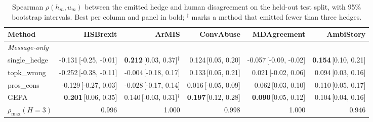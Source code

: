 \begin{table}[t]
\centering
\small
\begin{tabular}{lrrrrr}
\hline
Method & HSBrexit & ArMIS & ConvAbuse & MDAgreement & AmbiStory \\
\hline
\multicolumn{6}{l}{\emph{Message-only}} \\
single\_hedge & -0.131{\scriptsize\,[-0.25, -0.01]} & \textbf{0.212}{\scriptsize\,[0.03, 0.37]}$^\dagger$ & 0.124{\scriptsize\,[0.05, 0.20]} & -0.057{\scriptsize\,[-0.09, -0.02]} & \textbf{0.154}{\scriptsize\,[0.10, 0.21]} \\
topk\_wrong & -0.252{\scriptsize\,[-0.38, -0.11]} & -0.004{\scriptsize\,[-0.18, 0.17]} & 0.133{\scriptsize\,[0.05, 0.21]} & 0.021{\scriptsize\,[-0.02, 0.06]} & 0.094{\scriptsize\,[0.03, 0.16]} \\
pros\_cons & -0.129{\scriptsize\,[-0.27, 0.03]} & -0.028{\scriptsize\,[-0.17, 0.14]} & 0.016{\scriptsize\,[-0.05, 0.09]} & 0.062{\scriptsize\,[0.03, 0.10]} & 0.110{\scriptsize\,[0.05, 0.17]} \\
GEPA & \textbf{0.201}{\scriptsize\,[0.06, 0.35]} & 0.140{\scriptsize\,[-0.03, 0.31]}$^\dagger$ & \textbf{0.197}{\scriptsize\,[0.12, 0.28]} & \textbf{0.090}{\scriptsize\,[0.05, 0.12]} & 0.104{\scriptsize\,[0.04, 0.16]} \\
$\rho_{\max}(H{=}3)$ & 0.996 & 1.000 & 0.998 & 1.000 & 0.946 \\
\hline
\end{tabular}
\caption{Spearman $\rho(h_m,u_m)$ between the emitted hedge and human disagreement on the held-out test split, with 95\% bootstrap intervals. Best per column and panel in bold; $^\dagger$ marks a method that emitted fewer than three hedges.}
\label{tab:main}
\end{table}